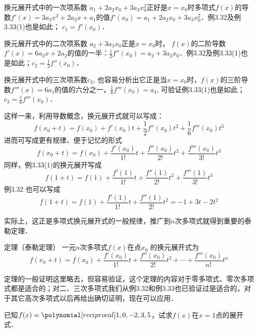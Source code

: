 换元展开式中的一次项系数 $a_1+2a_2x_0+3a_3x_0^2$正好是$x=x_0$时多项式$f(x)$的导数$f'(x)=3a_3x^2+2a_2x+a_1$的值$f'(x_0)=a_1+2a_2x_0+3a_3x_0^2$．例3.32及例3.33(1)也是如此；
$c_1 =f' (x_0)$．

换元展开式中的二次项系数 $a_2+3a_3x_0$正是$x=x_0$时，
$f(x)$的二阶导数$f'(x)=6a_3x+2a_2$的值的一半：$\frac{1}{2}f''(x_0)=a_2+3a_3x_0$．例3.32及例3.33(1)也是如此；$c_2=\frac{1}{2}f''(x_0)$．

换元展开式中的三次项系数$c_3$, 也容易分析出它正是当$x=x_0$时，$f(x)$的三阶导数$f'''(x)=6a_1$的值的六分之一，$\frac{1}{6}f'''(x_0)=a_3$, 可验证例3.33(1)也是如此；
$c_3=\frac{1}{6}f''' (x_0)$．

这样一来，利用导数概念，换元展开式就可以写成：
\[f(x_0+t)=f(x_0)+f'(x_0)t+\frac{1}{2}f''(x_0)t^2+\frac{1}{6}f'''(x_0)t^3\]    
进而可写成更有规律、便于记忆的形式
\[f(x_0+t)=f(x_0)+\frac{f'(x_0)}{1!}t+\frac{f''(x_0)}{2!}t^2+\frac{f'''(x_0)}{3!}t^3\]    
同样，例3.33(1)的换元展开写成
\[f (1+t) =f (1) +\frac{f'(1)}{1!}t+\frac{f''(1)}{2!}t^2+\frac{f'''(1)}{3!}t^3\]
例3.32 也可以写成
\[f (1+t) =f (1) +\frac{f'(1)}{1!}t+\frac{f''(1)}{2!}t^2=-1+3t-2t^2\]

实际上，这正是多项式换元展开式的一般规律，推广到$n$次多项式就得到重要的泰勒定理．
    
\begin{blk}{定理（泰勒定理）}
 一元$n$次多项式$f(x)$在点$x_0$
的换元展开式为
\begin{equation}
    f(x_0+t)=f(x_0)+\frac{f'(x_0)}{1!}t+\frac{f''(x_0)}{2!}t^2+\cdots+\frac{f'''(x_0)}{n!}t^n
\end{equation}   
\end{blk}

定理的一般证明这里略去，但容易验证，这个定理的内容对于零多项式、零次多项式都是适合的；对二、三次多项式我们从例3.32和例3.33也已验证过是适合的，对于其它高次多项式以后再给出确切证明，现在可以应用．

    \begin{example}
已知$f(x)=\poly{1,0,-2,3,5}$，试求$f(x)$在$x=1$点的展开式．    
    \end{example}    
    
